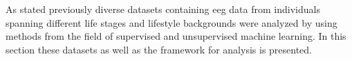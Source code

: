 As stated previously diverse datasets containing \gls{eeg} data from individuals spanning different life stages and lifestyle backgrounds were analyzed by using methods from the field of supervised and unsupervised machine learning. In this section these datasets as well as the framework for analysis is presented.  




